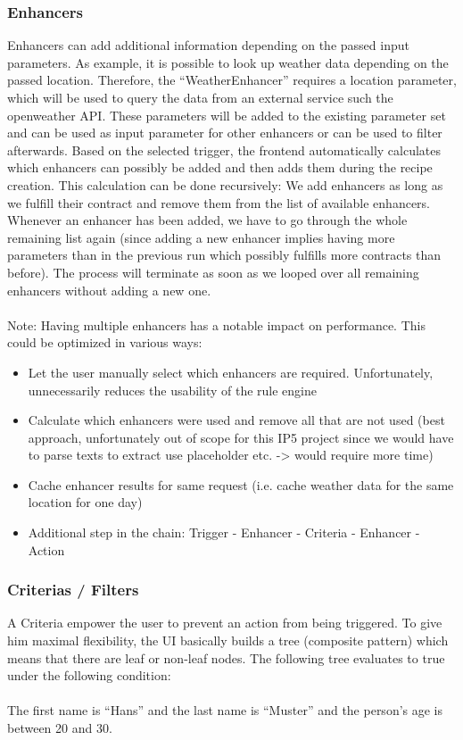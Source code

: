\documentclass[11pt]{article} %
\begin{document}
\subsubsection{Enhancers}
Enhancers can add additional information depending on the passed input parameters. As example, it is possible to look up weather data depending on the passed location. Therefore, the “WeatherEnhancer” requires a location parameter, which will be used to query the data from an external service such the openweather\cite{openweather} API. These parameters will be added to the existing parameter set and can be used as input parameter for other enhancers or can be used to filter afterwards. Based on the selected trigger, the frontend automatically calculates which enhancers can possibly be added and then adds them during the recipe creation. This calculation can be done recursively: We add enhancers as long as we fulfill their contract and remove them from the list of available enhancers. Whenever an enhancer has been added, we have to go through the whole remaining list again (since adding a new enhancer implies having more parameters than in the previous run which possibly fulfills more contracts than before). The process will terminate as soon as we looped over all remaining enhancers without adding a new one.\\
\\
Note: Having multiple enhancers has a  notable impact on performance. This could be optimized in various ways:

\begin{itemize}
  \item Let the user manually select which enhancers are required. Unfortunately, unnecessarily reduces the usability of the rule engine
  \item Calculate which enhancers were used and remove all that are not used (best approach, unfortunately out of scope for this IP5 project since we would have to parse texts to extract use placeholder etc. -> would require more time)
  \item Cache enhancer results for same request (i.e. cache weather data for the same location for one day)
  \item Additional step in the chain: Trigger - Enhancer - Criteria - Enhancer - Action
\end{itemize}

\newpage
\subsubsection{Criterias / Filters}
A Criteria empower the user to prevent an action from being triggered. To give him maximal flexibility, the UI basically builds a tree (composite pattern) which means that there are leaf or non-leaf nodes. The following tree evaluates to true under the following condition:\\
\\
The first name is “Hans” and the last name is “Muster” and the person’s age is between 20 and 30.
\end{document}
